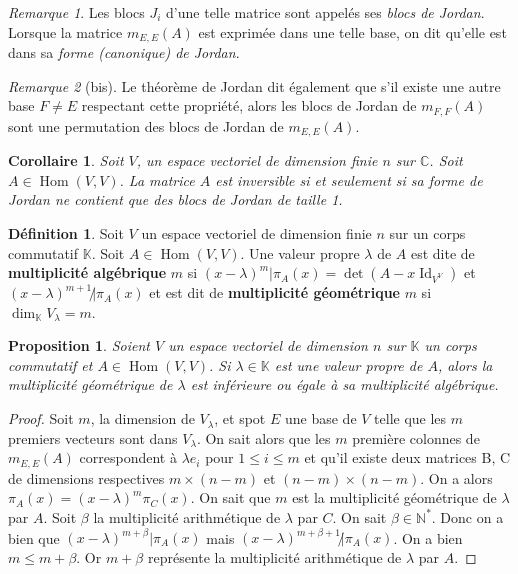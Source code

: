 \documentclass{article}
\DeclareMathOperator{\Id}{Id}
\DeclareMathOperator{\Hom}{Hom}
\newcommand{\N}{\mathbb N}
\newcommand{\C}{\mathbb C}
\newcommand{\K}{\mathbb K}
\newtheorem{prp}[thm]{Proposition}
\newtheorem{cor}[thm]{Corollaire}
\theoremstyle{definition}
\newtheorem{déf}[thm]{Définition}
\theoremstyle{remark}
\newtheorem*{rmq}{Remarque}
\begin{document}
		\begin{rmq} Les blocs $J_i$ d'une telle matrice sont appelés ses \textit{blocs de Jordan}. Lorsque la matrice $m_{E, E}(A)$ est exprimée dans une telle
		base, on dit qu'elle est dans sa \textit{forme (canonique) de Jordan}. \end{rmq}

		\begin{rmq}[bis] Le théorème de Jordan dit également que s'il existe une autre base $F \neq E$ respectant cette propriété, alors les blocs de Jordan de
		$m_{F, F}(A)$ sont une permutation des blocs de Jordan de $m_{E, E}(A)$. \end{rmq}

		\begin{cor} Soit $V$, un espace vectoriel de dimension finie $n$ sur $\C$. Soit $A \in \Hom(V, V)$. La matrice $A$ est inversible si et seulement si 
		sa forme de Jordan ne contient que des blocs de Jordan de taille 1. \end{cor}

		\begin{déf} Soit $V$ un espace vectoriel de dimension finie $n$ sur un corps commutatif $\K$. Soit $A \in \Hom(V, V)$. Une valeur propre $\lambda$
		de $A$ est dite de \textbf{multiplicité algébrique} $m$ si $(x-\lambda)^m | \pi_A(x) = \det(A - x\Id_{V^V})$ et $(x-\lambda)^{m+1} \not | \pi_A(x)$
		et est dit de \textbf{multiplicité géométrique} $m$ si $\dim_\K V_\lambda = m$. \end{déf}

		\begin{prp} Soient $V$ un espace vectoriel de dimension $n$ sur $\K$ un corps commutatif et $A \in \Hom(V, V)$. Si $\lambda \in \K$ est une valeur propre
		de $A$, alors la multiplicité géométrique de $\lambda$ est inférieure ou égale à sa multiplicité algébrique. \end{prp}

		\begin{proof} Soit $m$, la dimension de $V_\lambda$, et spot $E$ une base de $V$ telle que les $m$ premiers vecteurs sont dans $V_\lambda$.
		On sait alors que les $m$ première colonnes de $m_{E, E}(A)$ correspondent à $\lambda e_i$ pour $1 \leq i \leq m$ et qu'il existe deux matrices B, C
		de dimensions respectives $m \times (n-m)$ et $(n-m) \times (n-m)$. On a alors $\pi_A(x) = (x-\lambda)^m\pi_C(x)$. On sait que $m$ est la multiplicité
		géométrique de $\lambda$ par $A$. Soit $\beta$ la multiplicité arithmétique de $\lambda$ par $C$. On sait $\beta \in \N^*$. Donc on a bien que
		$(x-\lambda)^{m+\beta} | \pi_A(x)$ mais $(x-\lambda)^{m+\beta+1} \not | \pi_A(x)$. On a bien $m \leq m + \beta$. Or $m + \beta$ représente la multiplicité
		arithmétique de $\lambda$ par $A$. \end{proof}
\end{document}
